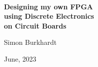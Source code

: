 \documentclass[twoside,final]{fhnwreport}       %
\begin{document}
\thispagestyle{empty}
	\begin{figure}
		\vspace*{-\topskip}\vspace*{-\headsep}
		\hspace{1cm}
	\end{figure}
	\begin{center}
		\vspace*{2.0cm}
		{\huge{\textbf{\thetitle}}}\\
		\vspace*{0.5cm}
		{\Large{\textbf{\sffamily Designing my own FPGA \\
					using Discrete Electronics \\
					on Circuit Boards }}}
		\vspace*{0.5cm}
		
		
		
		
		{\large{\sffamily Simon Burkhardt}} \\
		\vspace*{0.5cm}
		
		
		
		\large{June, 2023}
		

\end{center}
\end{document}
